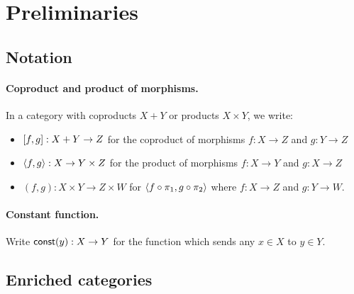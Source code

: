 \section{Preliminaries}

\subsection{Notation}

\paragraph{Coproduct and product of morphisms.}

In a category with coproducts $X + Y$ or products $X \times Y$, we write:
\begin{itemize}
\item $[f, g]: X + Y \to Z$ for the coproduct of morphisms $f: X \to Z$ and $g: Y \to Z$
\item $\langle f, g\rangle: X \to Y \times Z$ for the product of morphisms $f: X \to Y$ and $g: X \to Z$
\item $(f,g): X \times Y \to Z \times W$ for $\langle f \circ \pi_1, g \circ \pi_2\rangle$ where $f: X \to Z$ and $g: Y \to W$.
\end{itemize}

\paragraph{Constant function.}

Write $\mathsf{const}(y): X \to Y$ for the function which sends any $x \in X$ to $y \in Y$.

\subsection{Enriched categories}
